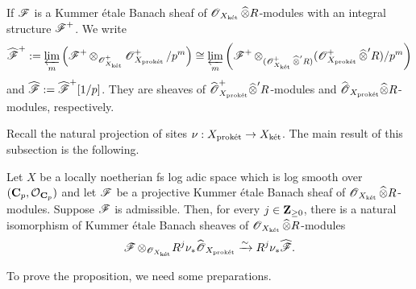 If $\scrF$ is a Kummer \'etale Banach sheaf of $\scrO_{X_{\ket}}\widehat{\otimes}R$-modules with an integral structure $\scrF^+$. We write
\[\widehat{\scrF}^+:=\varprojlim_m \left(\scrF^+\otimes_{\scrO^+_{X_{\ket}}}\scrO^+_{X_{\proket}}/p^m\right)\cong \varprojlim_m \left(\scrF^+\otimes_{(\scrO^+_{X_{\ket}}\widehat{\otimes}'R)}(\scrO^+_{X_{\proket}}\widehat{\otimes}'R)/p^m\right)\]
and $\widehat{\scrF}:=\widehat{\scrF}^+[1/p]$. They are sheaves of $\widehat{\scrO}^+_{X_{\proket}}\widehat{\otimes}'R$-modules and $\widehat{\scrO}_{X_{\proket}}\widehat{\otimes}R$-modules, respectively. 

Recall the natural projection of sites $\nu: X_{\proket}\rightarrow X_{\ket}$. The main result of this subsection is the following.

\begin{Proposition}\label{Proposition: generalised projection formula}
Let $X$ be a locally noetherian fs log adic space which is log smooth over $(\C_p, \calO_{\C_p})$ and let $\scrF$ be a projective Kummer \'etale Banach sheaf of $\scrO_{X_{\ket}}\widehat{\otimes}R$-modules. Suppose $\scrF$ is admissible. Then, for every $j\in \Z_{\geq 0}$, there is a natural isomorphism of Kummer \'etale Banach sheaves of $\scrO_{X_{\ket}}\widehat{\otimes} R$-modules
\[\scrF\otimes_{\scrO_{X_{\ket}}} R^j\nu_*\widehat{\scrO}_{X_{\proket}}\xrightarrow{\sim}R^j\nu_*\widehat{\scrF}.\]
\end{Proposition}

To prove the proposition, we need some preparations. 

